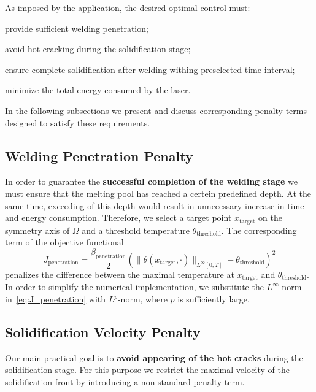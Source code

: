 As imposed by the application, the desired optimal control must:
\begin{enumeratearabic}
	\item provide sufficient welding penetration;
	\item avoid hot cracking during the solidification stage;
	\item ensure complete solidification after welding withing preselected time interval;
	\item minimize the total energy consumed by the laser.
\end{enumeratearabic}

In the following subsections we present and discuss corresponding penalty terms designed to satisfy these requirements.


\subsection{Welding Penetration Penalty}
\label{subsec:welding_penetration}

In order to guarantee the \textbf{successful completion of the welding stage} we must ensure that the melting pool has reached a certein predefined depth. At the same time, exceeding of this depth would result in unnecessary increase in time and energy consumption. Therefore, we select a target point $x_{\text{target}}$ on the symmetry axis of $\Omega$ and a threshold temperature $\theta_{\text{threshold}}$. The corresponding term of the objective functional
\begin{equation} \label{eq:J_penetration}
	J_{\text{penetration}} = \frac{\beta_\text{penetration}}{2} \left( \| \theta(x_{\text{target}},\cdot) \|_{L^{\infty}[0,T]} - \theta_{\text{threshold}} \right)^2
\end{equation}
penalizes the difference between the maximal temperature at $x_{\text{target}}$ and $\theta_{\text{threshold}}$. In order to simplify the numerical implementation, we substitute the $L^{\infty}$-norm in~\eqref{eq:J_penetration} with $L^{p}$-norm, where $p$ is sufficiently large.


\subsection{Solidification Velocity Penalty}
\label{subsec:velocity}

Our main practical goal is to \textbf{avoid appearing of the hot cracks} during the solidification stage. For this purpose we restrict the maximal velocity of the solidification front by introducing a non-standard penalty term.


